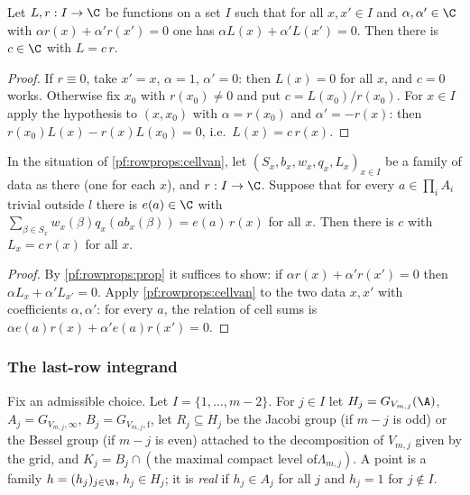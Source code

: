\begin{lemma}[Proportionality]\label{pf:rowprops:prop}
Let $L,r:I\to\C$ be functions on a set $I$ such that for all $x,x'\in I$ and $\alpha,\alpha'\in\C$ with
$\alpha r(x)+\alpha'r(x')=0$ one has $\alpha L(x)+\alpha'L(x')=0$. Then there is $c\in\C$ with $L=c\,r$.
\end{lemma}

\begin{proof}
If $r\equiv0$, take $x'=x$, $\alpha=1$, $\alpha'=0$: then $L(x)=0$ for all $x$, and $c=0$ works. Otherwise fix $x_0$ with
$r(x_0)\ne0$ and put $c=L(x_0)/r(x_0)$. For $x\in I$ apply the hypothesis to $(x,x_0)$ with $\alpha=r(x_0)$ and
$\alpha'=-r(x)$: then $r(x_0)L(x)-r(x)L(x_0)=0$, i.e.\ $L(x)=c\,r(x)$.
\end{proof}

\begin{corollary}\label{pf:rowprops:propcell}
In the situation of \cref{pf:rowprops:cellvan}, let $(S_x,b_x,w_x,q_x,L_x)_{x\in I}$ be a family of data as there (one
for each $x$), and $r:I\to\C$. Suppose that for every $a\in\prod_iA_i$ trivial outside $l$ there is $e(a)\in\C$ with
$\sum_{\beta\in S_x}w_x(\beta)q_x(ab_x(\beta))=e(a)\,r(x)$ for all $x$. Then there is $c$ with $L_x=c\,r(x)$ for all $x$.
\end{corollary}

\begin{proof}
By \cref{pf:rowprops:prop} it suffices to show: if $\alpha r(x)+\alpha'r(x')=0$ then $\alpha L_x+\alpha'L_{x'}=0$. Apply
\cref{pf:rowprops:cellvan} to the two data $x,x'$ with coefficients $\alpha,\alpha'$: for every $a$, the relation of cell
sums is $\alpha e(a)r(x)+\alpha'e(a)r(x')=0$.
\end{proof}

\subsubsection{The last-row integrand}
Fix an admissible choice. Let $I=\{1,\dots,m-2\}$. For $j\in I$ let $H_j=G_{V_{m,j}}(\A)$, $A_j=G_{V_{m,j},\infty}$,
$B_j=G_{V_{m,j},\mathrm f}$, let $R_j\subseteq H_j$ be the Jacobi group (if $m-j$ is odd) or the Bessel group (if $m-j$ is even)
attached to the decomposition of $V_{m,j}$ given by the grid, and $K_j=B_j\cap(\text{the maximal compact level of
}\Lambda_{m,j})$. A point is a family $h=(h_j)_{j\in\N}$, $h_j\in H_j$; it is \emph{real} if $h_j\in A_j$ for all $j$ and
$h_j=1$ for $j\notin I$.

